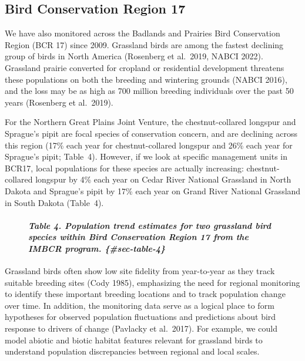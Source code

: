 \documentclass[
  letterpaper,
  DIV=11,
  numbers=noendperiod,
  oneside]{scrreprt}
\let\oldparagraph\paragraph
\renewcommand{\paragraph}[1]{\oldparagraph{#1}\mbox{}}
\begin{document}
\hypertarget{bird-conservation-region-17-1}{%
\subsection{Bird Conservation Region
17}\label{bird-conservation-region-17-1}}

We have also monitored across the Badlands and Prairies Bird
Conservation Region (BCR 17) since 2009. Grassland birds are among the
fastest declining group of birds in North America (Rosenberg et
al.~2019, NABCI 2022). Grassland prairie converted for cropland or
residential development threatens these populations on both the breeding
and wintering grounds (NABCI 2016), and the loss may be as high as 700
million breeding individuals over the past 50 years (Rosenberg et
al.~2019).

For the Northern Great Plains Joint Venture, the chestnut-collared
longspur and Sprague's pipit are focal species of conservation concern,
and are declining across this region (17\% each year for
chestnut-collared longspur and 26\% each year for Sprague's pipit;
Table~{4}). However, if we look at specific management units in BCR17,
local populations for these species are actually increasing:
chestnut-collared longspur by 4\% each year on Cedar River National
Grassland in North Dakota and Sprague's pipit by 17\% each year on Grand
River National Grassland in South Dakota (Table~{4}).

\begin{figure}

\hypertarget{table-4.-population-trend-estimates-for-two-grassland-bird-species-within-bird-conservation-region-17-from-the-imbcr-program.-sec-table-4}{%
\paragraph{\texorpdfstring{\emph{Table 4. Population trend estimates for
two grassland bird species within Bird Conservation Region 17 from the
IMBCR program.
\{\#sec-table-4\}}}{Table 4. Population trend estimates for two grassland bird species within Bird Conservation Region 17 from the IMBCR program. \{\#sec-table-4\}}}\label{table-4.-population-trend-estimates-for-two-grassland-bird-species-within-bird-conservation-region-17-from-the-imbcr-program.-sec-table-4}}

\end{figure}

Grassland birds often show low site fidelity from year-to-year as they
track suitable breeding sites (Cody 1985), emphasizing the need for
regional monitoring to identify these important breeding locations and
to track population change over time. In addition, the monitoring data
serve as a logical place to form hypotheses for observed population
fluctuations and predictions about bird response to drivers of change
(Pavlacky et al.~2017). For example, we could model abiotic and biotic
habitat features relevant for grassland birds to understand population
discrepancies between regional and local scales.
\end{document}
